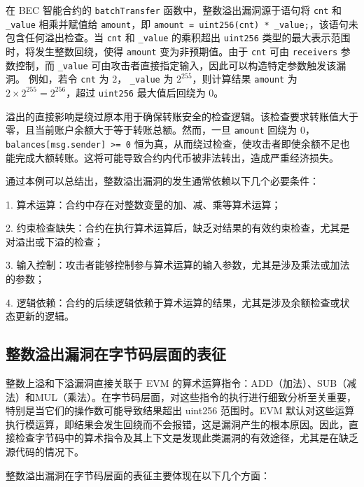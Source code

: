 \documentclass[print, master, vlined, timesmath]{DissertUESTC}
\begin{document}


在 BEC 智能合约的 \texttt{batchTransfer} 函数中，整数溢出漏洞源于语句将 \texttt{cnt} 和 \texttt{\_value} 相乘并赋值给 \texttt{amount}，即 \texttt{amount = uint256(cnt) * \_value;}，该语句未包含任何溢出检查。当 \texttt{cnt} 和 \texttt{\_value} 的乘积超出 \texttt{uint256} 类型的最大表示范围时，将发生整数回绕，使得 \texttt{amount} 变为非预期值。由于 \texttt{cnt} 可由 \texttt{receivers} 参数控制，而 \texttt{\_value} 可由攻击者直接指定输入，因此可以构造特定参数触发该漏洞。 例如，若令 \texttt{cnt} 为 $2$， \texttt{\_value} 为 $2^{255}$，则计算结果 \texttt{amount} 为 $2 \times 2^{255} = 2^{256}$，超过 \texttt{uint256} 最大值后回绕为 $0$。

溢出的直接影响是绕过原本用于确保转账安全的检查逻辑。该检查要求转账值大于零，且当前账户余额大于等于转账总额。然而，一旦 \texttt{amount} 回绕为 $0$，\texttt{balances[msg.sender] >= 0} 恒为真，从而绕过检查，使攻击者即使余额不足也能完成大额转账。这将可能导致合约内代币被非法转出，造成严重经济损失。

通过本例可以总结出，整数溢出漏洞的发生通常依赖以下几个必要条件：

1. 算术运算：合约中存在对整数变量的加、减、乘等算术运算；

2. 约束检查缺失：合约在执行算术运算后，缺乏对结果的有效约束检查，尤其是对溢出或下溢的检查；

3. 输入控制：攻击者能够控制参与算术运算的输入参数，尤其是涉及乘法或加法的参数；

4. 逻辑依赖：合约的后续逻辑依赖于算术运算的结果，尤其是涉及余额检查或状态更新的逻辑。 


\subsection{整数溢出漏洞在字节码层面的表征}
整数上溢和下溢漏洞直接关联于 EVM 的算术运算指令：ADD（加法）、SUB（减法）和MUL（乘法）。在字节码层面，对这些指令的执行进行细致分析至关重要，特别是当它们的操作数可能导致结果超出 uint256 范围时。EVM 默认对这些运算执行模运算，即结果会发生回绕而不会报错，这是漏洞产生的根本原因。因此，直接检查字节码中的算术指令及其上下文是发现此类漏洞的有效途径，尤其是在缺乏源代码的情况下。

整数溢出漏洞在字节码层面的表征主要体现在以下几个方面：
\end{document}
